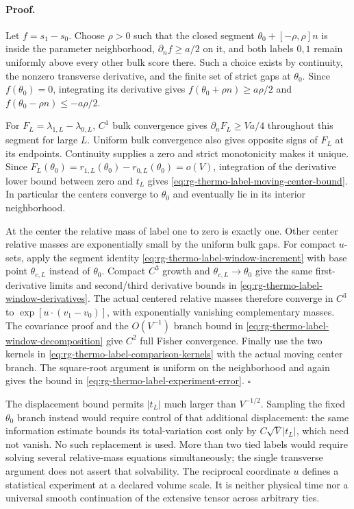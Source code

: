 \paragraph{Proof.}
Let $f=s_1-s_0$. Choose $\rho>0$ such that the closed segment
$\theta_0+[-\rho,\rho]n$ is inside the parameter neighborhood,
$\partial_nf\geq a/2$ on it, and both labels $0,1$ remain uniformly
above every other bulk score there. Such a choice exists by continuity,
the nonzero transverse derivative, and the finite set of strict gaps
at $\theta_0$. Since $f(\theta_0)=0$, integrating its derivative gives
$f(\theta_0+\rho n)\geq a\rho/2$ and
$f(\theta_0-\rho n)\leq-a\rho/2$.

For $F_L=\lambda_{1,L}-\lambda_{0,L}$, $C^1$ bulk convergence gives
$\partial_nF_L\geq Va/4$ throughout this segment for large $L$.
Uniform bulk convergence also gives opposite signs of $F_L$ at its
endpoints. Continuity supplies a zero and strict monotonicity makes
it unique. Since
$F_L(\theta_0)=r_{1,L}(\theta_0)-r_{0,L}(\theta_0)=o(V)$, integration
of the derivative lower bound between zero and $t_L$ gives
\cref{eq:rg-thermo-label-moving-center-bound}. In particular the centers
converge to $\theta_0$ and eventually lie in its interior neighborhood.

At the center the relative mass of label one to zero is exactly one.
Other center relative masses are exponentially small by the uniform
bulk gaps. For compact $u$-sets, apply the segment identity
\cref{eq:rg-thermo-label-window-increment} with base point
$\theta_{c,L}$ instead of $\theta_0$. Compact $C^3$ growth and
$\theta_{c,L}\to\theta_0$ give the same first-derivative limits and
second/third derivative bounds in
\cref{eq:rg-thermo-label-window-derivatives}. The actual centered
relative masses therefore converge in $C^3$ to
$\exp[u\cdot(v_1-v_0)]$, with exponentially vanishing complementary
masses. The covariance proof and the $O(V^{-1})$ branch bound in
\cref{eq:rg-thermo-label-window-decomposition} give $C^2$ full Fisher
convergence. Finally use the two kernels in
\cref{eq:rg-thermo-label-comparison-kernels} with the actual moving
center branch. The square-root argument is uniform on the neighborhood
and again gives the bound in
\cref{eq:rg-thermo-label-experiment-error}. $\square$

The displacement bound permits $|t_L|$ much larger than $V^{-1/2}$.
Sampling the fixed $\theta_0$ branch instead would require control of
that additional displacement: the same information estimate bounds
its total-variation cost only by $C\sqrt V|t_L|$, which need not vanish.
No such replacement is used. More than two tied labels would require
solving several relative-mass equations simultaneously; the single
transverse argument does not assert that solvability. The reciprocal
coordinate $u$ defines a statistical experiment at a declared volume
scale. It is neither physical time nor a universal smooth continuation
of the extensive tensor across arbitrary ties.

